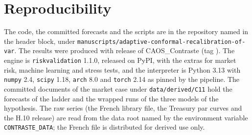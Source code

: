\section{Reproducibility}
\label{sec:reproducibility}

The code, the committed forecasts and the scripts are in the repository named in the header block, under \texttt{manuscripts/adaptive-conformal-recalibration-of-var}. The results were produced with release \docversion{} of CAOS\_Contraste (tag \docversion{}). The engine is \texttt{riskvalidation} 1.1.0, released on PyPI, with the extras for market risk, machine learning and stress tests, and the interpreter is Python 3.13 with \texttt{numpy} 2.4, \texttt{scipy} 1.18, \texttt{arch} 8.0 and \texttt{torch} 2.14 as pinned by the pipeline. The committed documents of the market case under \texttt{data/derived/C11} hold the forecasts of the ladder and the wrapped runs of the three models of the hypothesis. The raw series (the French library file, the Treasury par curves and the H.10 release) are read from the data root named by the environment variable \texttt{CONTRASTE\_DATA}; the French file is distributed for derived use only. %

